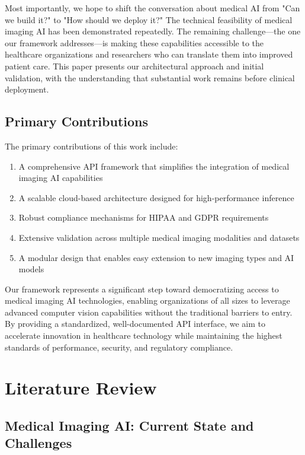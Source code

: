 \documentclass[12pt,a4paper]{article}
\begin{document}
Most importantly, we hope to shift the conversation about medical AI from "Can we build it?" to "How should we deploy it?" The technical feasibility of medical imaging AI has been demonstrated repeatedly. The remaining challenge—the one our framework addresses—is making these capabilities accessible to the healthcare organizations and researchers who can translate them into improved patient care. This paper presents our architectural approach and initial validation, with the understanding that substantial work remains before clinical deployment.

\subsection{Primary Contributions}

The primary contributions of this work include:

\begin{enumerate}
    \item A comprehensive API framework that simplifies the integration of medical imaging AI capabilities
    \item A scalable cloud-based architecture designed for high-performance inference
    \item Robust compliance mechanisms for HIPAA and GDPR requirements
    \item Extensive validation across multiple medical imaging modalities and datasets
    \item A modular design that enables easy extension to new imaging types and AI models
\end{enumerate}

Our framework represents a significant step toward democratizing access to medical imaging AI technologies, enabling organizations of all sizes to leverage advanced computer vision capabilities without the traditional barriers to entry. By providing a standardized, well-documented API interface, we aim to accelerate innovation in healthcare technology while maintaining the highest standards of performance, security, and regulatory compliance.

\section{Literature Review}

\subsection{Medical Imaging AI: Current State and Challenges}
\end{document}
